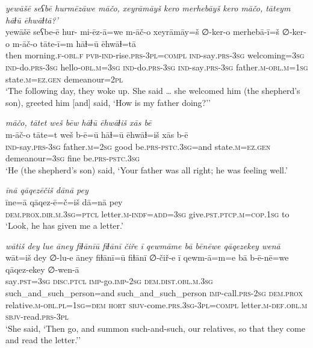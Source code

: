 \ea \label{KŠ.81}
\textit{yewāšē seʕbē hurmēzāwe māčo, xeyrāmāyš kero merhebāyš kero māčo, tāteym hāɫū ēhwāɫtā?’} \\ 
\gll yewāšē seʕbe-ē hur- mi-ēz-ā=we m-āč-o xeyrāmāy=š ∅-ker-o merhebā-ī=š ∅-ker-o m-āč-o tāte-ī=m hāɫ=ū ēhwāɫ=tā \\ 
 then morning\textsc{.f}\textsc{-obl}\textsc{.f} \textsc{pvb-}\textsc{ind-}rise\textsc{.prs}\textsc{-3pl}\textsc{=compl} \textsc{ind-}say\textsc{.prs}\textsc{-3sg} welcoming\textsc{=3sg} \textsc{ind-}do\textsc{.prs}\textsc{-3sg} hello\textsc{-obl}\textsc{.m}\textsc{=3sg} \textsc{ind-}do\textsc{.prs}\textsc{-3sg} \textsc{ind-}say\textsc{.prs}\textsc{-3sg} father\textsc{.m}\textsc{-obl}\textsc{.m}\textsc{=\textsc{1sg}} state\textsc{.m}\textsc{\textsc{=ez.gen}} demeanour=\textsc{2pl} \\ 
\glt `The following day, they woke up. She said … she welcomed him (the shepherd’s son), greeted him [and] said, ‘How is my father doing?’'
\z 
 
\ea \label{KŠ.82}
\textit{māčo, tātet weš bēw hāɫū ēhwāɫiš xās bē} \\ 
\gll m-āč-o tāte=t weš b-ē=ū hāɫ=ū ēhwāɫ=iš xās b-ē \\ 
 \textsc{ind-}say\textsc{.prs}\textsc{-3sg} father\textsc{.m}\textsc{=\textsc{2sg}} good be\textsc{.prs}\textsc{-pstc}\textsc{.3sg}=and state\textsc{.m}\textsc{\textsc{=ez.gen}} demeanour\textsc{=3sg} fine be\textsc{.prs}\textsc{-pstc}\textsc{.3sg} \\ 
\glt `He (the shepherd’s son) said, ‘Your father was all right; he was feeling well.'
\z 
 
\ea \label{KŠ.84}
\textit{īnā qāqezēčiš dānā pey} \\ 
\gll īne=ā qāqez-ē=č=iš dā=nā pey \\ 
 \textsc{dem.prox}\textsc{.dir}\textsc{.m}\textsc{.3sg}=\textsc{ptcl} letter\textsc{.m}\textsc{-indf}\textsc{=add}\textsc{=3sg} give\textsc{.pst}\textsc{.ptcp}\textsc{.m}\textsc{=cop}\textsc{.\textsc{1sg}} to \\ 
\glt `Look, he has given me a letter.'
\z 
 
\ea \label{KŠ.86}
\textit{wātiš dey lue āney fiɫānīū fiɫānī čiře ī qewmāme bā bēnēwe qāqezekey wenā} \\ 
\gll wāt=iš dey ∅-lu-e āney fiɫānī=ū fiɫānī ∅-čiř-e ī qewm-ā=m=e bā b-ē-nē=we qāqez-ekey ∅-wen-ā \\ 
 say\textsc{.pst}\textsc{=3sg} \textsc{disc.ptcl} \textsc{imp-}go.\textsc{imp-}\textsc{2sg} \textsc{dem.dist}\textsc{.obl}\textsc{.m}\textsc{.3sg} such\_and\_such\_person=and such\_and\_such\_person \textsc{imp-}call\textsc{.prs}-\textsc{2sg} \textsc{dem.prox} relative\textsc{.m}\textsc{-obl}\textsc{.pl}\textsc{=\textsc{1sg}}\textsc{=dem} \textsc{hort} \textsc{sbjv-}come\textsc{.prs}\textsc{.3sg}\textsc{-3pl}\textsc{=compl} letter\textsc{.m}\textsc{-def}\textsc{.obl}\textsc{.m} \textsc{sbjv-}read\textsc{.prs}\textsc{-3pl} \\ 
\glt `She said, ‘Then go, and summon such-and-such, our relatives, so that they come and read the letter.’'
\z 
 
